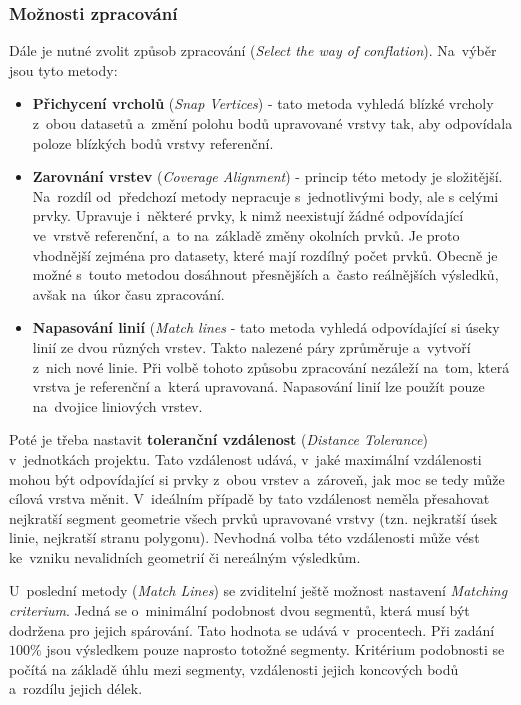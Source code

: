 \subsubsection{Možnosti zpracování}
Dále je nutné zvolit způsob zpracování (\textit{Select the way of conflation}). 
Na~výběr jsou tyto metody:
\begin{itemize}
 \item \textbf{Přichycení vrcholů} (\textit{Snap Vertices}) - tato metoda vyhledá 
	blízké vrcholy z~obou datasetů a~změní polohu bodů upravované vrstvy tak, 
	aby odpovídala poloze blízkých bodů vrstvy referenční.
 \item \textbf{Zarovnání vrstev} (\textit{Coverage Alignment}) - princip této 
	metody je složitější. Na~rozdíl od~předchozí metody nepracuje s~jednotlivými
	body, ale s celými prvky. Upravuje i~některé prvky, k nimž neexistují 
	žádné odpovídající ve~vrstvě refe\-renční, a~to na~základě změny okolních 
	prvků. Je proto vhodnější zejména pro datasety, které mají rozdílný počet
	prvků. Obecně je možné s~touto metodou dosáhnout přesnějších a~často
	reálnějších výsledků, avšak na~úkor času zpraco\-vání.
 \item \textbf{Napasování linií} (\textit{Match lines} - tato metoda vyhledá
	odpovídající si úseky linií ze dvou různých vrstev. Takto nalezené
	páry zprůměruje a~vytvoří z~nich nové linie. Při volbě tohoto způsobu
	zpracování nezáleží na~tom, která vrstva je referenční a~která upravovaná.
	Napasování linií lze použít pouze na~dvojice liniových vrstev.
\end{itemize}

Poté je třeba nastavit \textbf{toleranční vzdálenost} (\textit{Distance 
Tolerance}) v~jednotkách projektu. Tato vzdálenost udává, v~jaké maximální 
vzdálenosti mohou být odpovídající si prvky z~obou vrstev a~zároveň, jak 
moc se tedy může cílová vrstva měnit. V~ideálním případě by tato vzdálenost 
neměla přesahovat nejkratší segment geometrie všech prvků upravované vrstvy 
(tzn. nejkratší úsek linie, nejkratší stranu polygonu). Nevhodná volba této 
vzdálenosti může vést ke~vzniku nevalidních geometrií či nereálným výsledkům.

U~poslední metody (\textit{Match Lines}) se zviditelní ještě možnost nastavení
\textit{Matching criterium}. Jedná se o~minimální podobnost dvou segmentů,
která musí být dodržena pro jejich spárování. Tato hodnota se udává v~procentech.
Při zadání $100 \%$ jsou výsledkem pouze naprosto totožné segmenty. Kritérium
podobnosti se počítá na základě úhlu mezi segmenty, vzdálenosti jejich koncových
bodů a~rozdílu jejich délek. 
 

